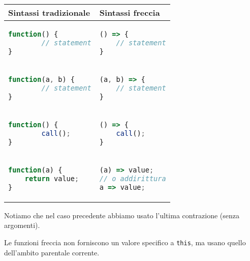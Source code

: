 \documentclass[a4paper,11pt]{article}
\begin{document}
\begin{table}[h]
	\center {}
\begin{tabular} { p{5cm} | p{5cm} }
		\bfseries Sintassi tradizionale & \bfseries Sintassi freccia \\
		\hline 

\begin{lstlisting}[language=javascript, style=codestyle]	
function() {
		// statement
}
\end{lstlisting} &
\begin{lstlisting}[language=javascript, style=codestyle]	
() => {
	// statement
}
\end{lstlisting} \\

\begin{lstlisting}[language=javascript, style=codestyle]	
function(a, b) {
		// statement
}
\end{lstlisting} &
\begin{lstlisting}[language=javascript, style=codestyle]	
(a, b) => {
	// statement
}
\end{lstlisting} \\

\begin{lstlisting}[language=javascript, style=codestyle]	
function() {
		call();
}
\end{lstlisting} &
\begin{lstlisting}[language=javascript, style=codestyle]	
() => {
	call();
}
\end{lstlisting} \\

\begin{lstlisting}[language=javascript, style=codestyle]	
function(a) {
	return value;
}
\end{lstlisting} &
\begin{lstlisting}[language=javascript, style=codestyle]	
(a) => value; 
// o addirittura
a => value;
\end{lstlisting} \\
	\end{tabular}
\end{table}

Notiamo che nel caso precedente abbiamo usato l'ultima contrazione (senza argomenti). 

Le funzioni freccia non forniscono un valore specifico a \lstinline|this|, ma usano quello dell'ambito parentale corrente.
\end{document}
